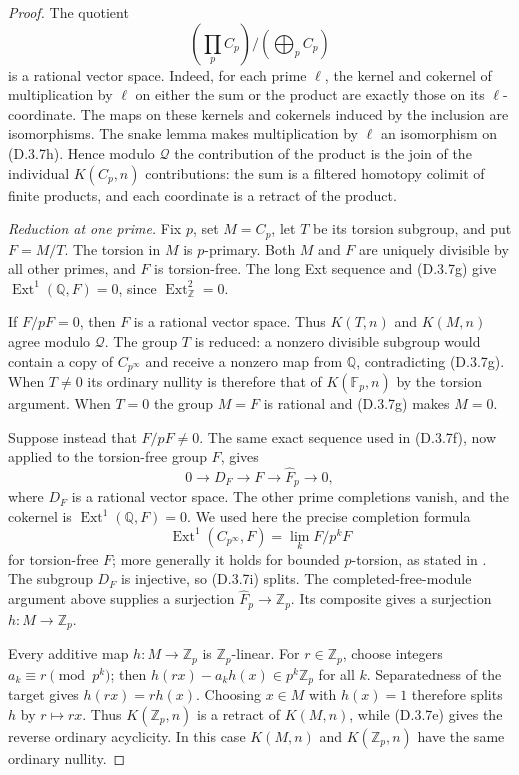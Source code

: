 \begin{proof}
The quotient
\[
                     (\prod_p C_p)/(\bigoplus_p C_p)
 \tag{D.3.7h}
\]
is a rational vector space.  Indeed, for each prime $\ell$, the
kernel and cokernel of multiplication by $\ell$ on either the sum
or the product are exactly those on its $\ell$-coordinate.  The
maps on these kernels and cokernels induced by the inclusion are
isomorphisms.  The snake lemma makes multiplication by $\ell$ an
isomorphism on (D.3.7h).  Hence modulo $\mathcal Q$ the contribution
of the product is the join of the individual $K(C_p,n)$
contributions: the sum is a filtered homotopy colimit of finite
products, and each coordinate is a retract of the product.

\medskip\noindent
\emph{Reduction at one prime.}
Fix $p$, set $M=C_p$, let $T$ be its torsion subgroup, and put
$F=M/T$.  The torsion in $M$ is $p$-primary.  Both $M$ and $F$ are
uniquely divisible by all other primes, and $F$ is torsion-free.
The long Ext sequence and (D.3.7g) give
$\operatorname{Ext}^1(\mathbb Q,F)=0$, since
$\operatorname{Ext}^2_{\mathbb Z}=0$.

If $F/pF=0$, then $F$ is a rational vector space.  Thus $K(T,n)$
and $K(M,n)$ agree modulo $\mathcal Q$.  The group $T$ is reduced:
a nonzero divisible subgroup would contain a copy of
$C_{p^\infty}$ and receive a nonzero map from $\mathbb Q$,
contradicting (D.3.7g).  When $T\ne0$ its ordinary nullity is
therefore that of $K(\mathbb F_p,n)$ by the torsion argument.
When $T=0$ the group $M=F$ is rational and (D.3.7g) makes $M=0$.

Suppose instead that $F/pF\ne0$.  The same exact sequence used in
(D.3.7f), now applied to the torsion-free group $F$, gives
\[
 0\longrightarrow D_F\longrightarrow F
                    \longrightarrow\widehat F_p\longrightarrow0,
 \tag{D.3.7i}
\]
where $D_F$ is a rational vector space.  The other prime completions
vanish, and the cokernel is
$\operatorname{Ext}^1(\mathbb Q,F)=0$.  We used here the precise
completion formula
\[
 \operatorname{Ext}^1(C_{p^\infty},F)=\lim_k F/p^kF
\]
for torsion-free $F$; more generally it holds for bounded
$p$-torsion, as stated in
\citet[Section~4, p.~41]{Bousfield1996ULP}.  The subgroup $D_F$
is injective, so (D.3.7i) splits.  The completed-free-module
argument above supplies a surjection
$\widehat F_p\to\mathbb Z_p$.  Its composite gives a surjection
$h:M\to\mathbb Z_p$.

Every additive map $h:M\to\mathbb Z_p$ is
$\mathbb Z_p$-linear.  For $r\in\mathbb Z_p$, choose integers
$a_k\equiv r\pmod {p^k}$; then
$h(rx)-a_kh(x)\in p^k\mathbb Z_p$ for all $k$.
Separatedness of the target gives $h(rx)=rh(x)$.  Choosing
$x\in M$ with $h(x)=1$ therefore splits $h$ by $r\mapsto rx$.
Thus $K(\mathbb Z_p,n)$ is a retract of $K(M,n)$, while (D.3.7e)
gives the reverse ordinary acyclicity.  In this case $K(M,n)$ and
$K(\mathbb Z_p,n)$ have the same ordinary nullity.


\end{proof}
